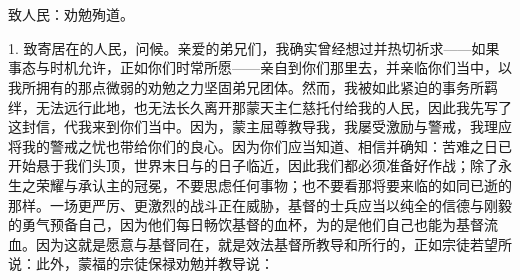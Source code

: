 

\section{}

致人民：劝勉殉道。\par

\par

1. 致寄居在的人民，问候。亲爱的弟兄们，我确实曾经想过并热切祈求——如果事态与时机允许，正如你们时常所愿——亲自到你们那里去，并亲临你们当中，以我所拥有的那点微弱的劝勉之力坚固弟兄团体。然而，我被如此紧迫的事务所羁绊，无法远行此地，也无法长久离开那蒙天主仁慈托付给我的人民，因此我先写了这封信，代我来到你们当中。因为，蒙主屈尊教导我，我屡受激励与警戒，我理应将我的警戒之忧也带给你们的良心。因为你们应当知道、相信并确知：苦难之日已开始悬于我们头顶，世界末日与的日子临近，因此我们都必须准备好作战；除了永生之荣耀与承认主的冠冕，不要思虑任何事物；也不要看那将要来临的如同已逝的那样。一场更严厉、更激烈的战斗正在威胁，基督的士兵应当以纯全的信德与刚毅的勇气预备自己，因为他们每日畅饮基督的血杯，为的是他们自己也能为基督流血。因为这就是愿意与基督同在，就是效法基督所教导和所行的，正如宗徒若望所说：此外，蒙福的宗徒保禄劝勉并教导说：\par

